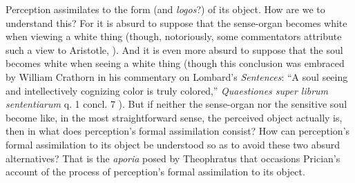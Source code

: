 \documentclass[12pt]{article}
\begin{document}

Perception assimilates to the form (and \emph{logos}?) of its object. How are we to understand this? For it is absurd to suppose that the sense-organ becomes white when viewing a white thing (though, notoriously, some commentators attribute such a view to Aristotle, \citealt{Slakey:1961ss, Sorabji:1974fk,Everson:1997ep}). And it is even more absurd to suppose that the soul becomes white when seeing a white thing (though this conclusion was embraced by William Crathorn in his commentary on Lombard's \emph{Sentences}: ``A soul seeing and intellectively cognizing color is truly colored,'' \emph{Quaestiones super librum sententiarum} q. 1 concl. 7 \citealt[288]{Pasnau:2002pb}). But if neither the sense-organ nor the sensitive soul become like, in the most straightforward sense, the perceived object actually is, then in what does perception's formal assimilation consist? How can perception's formal assimilation to its object be understood so as to avoid these two absurd alternatives? That is the \emph{aporia} posed by Theophratus that occasions Prician's account of the process of perception's formal assimilation to its object.
\end{document}
